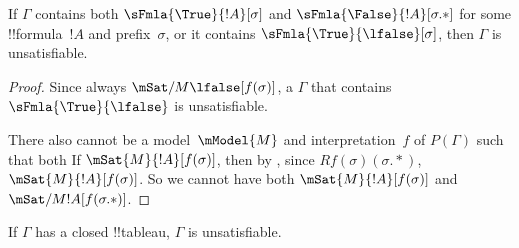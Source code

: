 \documentclass[../../../include/open-logic-section]{subfiles}
\begin{document}
\begin{prop}
  If $\Gamma$ contains both $\sFmla{\True}{!A}[\sigma]$ and
  $\sFmla{\False}{!A}[\sigma.{*}]$ for some !!{formula}~$!A$ and
  prefix~$\sigma$, or it contains $\sFmla{\True}{\lfalse}[\sigma]$, then $\Gamma$ is unsatisfiable.
\end{prop}

\begin{proof}
  Since always $\mSat/{M}{\lfalse}[f(\sigma)]$, a $\Gamma$ that
  contains $\sFmla{\True}{\lfalse}$ is unsatisfiable.

  There also cannot be a model~$\mModel{M}$ and interpretation~$f$ of
  $P(\Gamma)$ such that both If $\mSat{M}{!A}[f(\sigma)]$, then by
  , since
  $Rf(\sigma)(\sigma.{*})$, $\mSat{M}{!A}[f(\sigma)]$. So we cannot
  have both $\mSat{M}{!A}[f(\sigma)]$ and
  $\mSat/{M}{!A}[f(\sigma.{*})]$.
\end{proof}

\begin{thm}[Soundness]
  If $\Gamma$ has a closed !!{tableau}, $\Gamma$ is unsatisfiable.
\end{thm}
\end{document}
